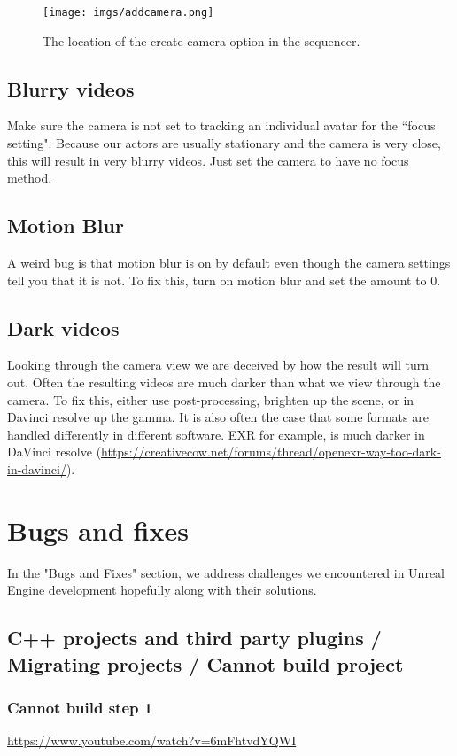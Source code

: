\documentclass{uva-inf-article}
\begin{document}
\begin{figure}[hbt!]
    \centering
    \texttt{[image: imgs/addcamera.png]}
    \caption{The location of the create camera option in the sequencer.}
    \label{fig:createCam}
\end{figure}

\subsection{Blurry videos}
Make sure the camera is not set to tracking an individual avatar for the ``focus setting". Because our actors are usually stationary and the camera is very close, this will result in very blurry videos. Just set the camera to have no focus method.

\subsection{Motion Blur}
A weird bug is that motion blur is on by default even though the camera settings tell you that it is not. To fix this, turn on motion blur and set the amount to 0.

\subsection{Dark videos}
Looking through the camera view we are deceived by how the result will turn out. Often the resulting videos are much darker than what we view through the camera. To fix this, either use post-processing, brighten up the scene, or in Davinci resolve up the gamma. It is also often the case that some formats are handled differently in different software. EXR for example, is much darker in DaVinci resolve (\url{https://creativecow.net/forums/thread/openexr-way-too-dark-in-davinci/}).


\section{Bugs and fixes}
In the "Bugs and Fixes" section, we address challenges we encountered in Unreal Engine development hopefully along with their solutions.

\subsection{C++ projects and third party plugins / Migrating projects / Cannot build project}\label{cppThirdPartyPluginsBug}
\subsubsection{Cannot build step 1} \url{https://www.youtube.com/watch?v=6mFhtvdYQWI}
\end{document}
